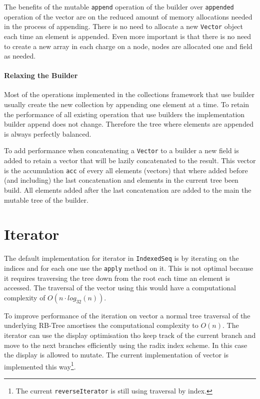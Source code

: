 The benefits of the mutable \texttt{append} operation of the builder over \texttt{appended} operation of the vector are on the reduced amount of memory allocations needed in the process of appending. There is no need to allocate a new \texttt{Vector} object each time an element is appended. Even more important is that there is no need to create a new array in each charge on a node, nodes are allocated one and field as needed. 

\paragraph{Relaxing the Builder}
Most of the operations implemented in the collections framework that use builder usually create the new collection by appending one element at a time. To retain the performance of all existing operation that use builders the implementation builder append does not change. Therefore the tree where elements are appended is always perfectly balanced.
 
 To add performance when concatenating a \texttt{Vector} to a builder a new field is added to retain a vector that will be lazily concatenated to the result. This vector is the accumulation \texttt{acc} of every all elements (vectors) that where added before (and including) the last concatenation and elements in the current tree been build. All elements added after the last concatenation are added to the main the mutable tree of the builder.


\clearpage
\section{Iterator}
The default implementation for iterator in \texttt{IndexedSeq} is by iterating on the indices and for each one use the \texttt{apply} method on it. This is not optimal because it requires traversing the tree down from the root each time an element is accessed. The traversal of the vector using this would have a computational complexity of $O(n \cdot log_{32}(n))$.

To improve performance of the iteration on vector a normal tree traversal of the underlying RB-Tree amortises the computational complexity to $O(n)$. The iterator can use the display optimisation tho keep track of the current branch and move to the next branches efficiently using the radix index scheme. In this case the display is allowed to mutate. The current implementation of vector is implemented this way\footnote{The current \texttt{reverseIterator} is still using traversal by index.}.

